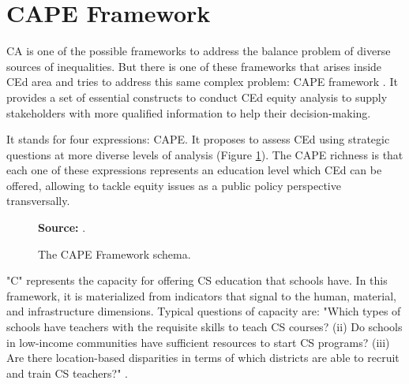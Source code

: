 \section{CAPE Framework}
\label{equity-sec:cape}

\gls{CA} is one of the possible frameworks to address the balance problem of diverse sources of inequalities. But there is one of these frameworks that arises inside \gls{CEd} area and tries to address this same complex problem: \gls{CAPE} framework \cite{fletcher:2021}. It provides a set of essential constructs to conduct \gls{CEd} equity analysis to supply stakeholders with more qualified information to help their decision-making.

It stands for four expressions: \acrfull{CAPE}. It proposes to assess \gls{CEd} using strategic questions at more diverse levels of analysis (Figure \ref{fig:cape-framework}). The \gls{CAPE} richness is that each one of these expressions represents an education level which \gls{CEd} can be offered, allowing to tackle equity issues as a public policy perspective transversally.

\begin{figure}[ht!]
\centering

\caption{\textmd{The \acrshort{CAPE} Framework schema.}}
\label{fig:cape-framework}

\par\medskip\ABNTEXfontereduzida\selectfont\textbf{Source:} .
\end{figure}

"C" represents the capacity for offering \gls{CS} education that schools have. In this framework, it is materialized from indicators that signal to the human, material, and infrastructure dimensions. Typical questions of capacity are: "Which types of schools have teachers with the requisite skills to teach \gls{CS} courses? (ii) Do schools in low-income communities have sufficient resources to start \gls{CS} programs? (iii) Are there location-based disparities in terms of which districts are able to recruit and train \gls{CS} teachers?" \cite[p.~4]{warner:2022}.

